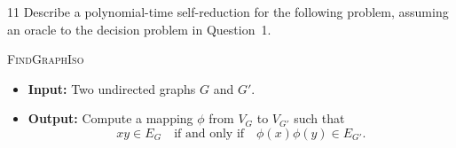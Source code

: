 \documentclass[12pt]{article}
\begin{document}
\begin{problem}{11}
    Describe a polynomial-time self-reduction for the following problem, assuming an oracle to the decision problem in Question~1.

    \begin{tcolorbox}
        \textsc{FindGraphIso}
        \begin{itemize}
            \item \textbf{Input:} Two undirected graphs $G$ and $G'$.
            \item \textbf{Output:} Compute a mapping $\phi$ from $V_G$ to $V_{G'}$ such that
            \[
            xy \in E_G
            \quad \text{if and only if} \quad
            \phi(x)\phi(y) \in E_{G'}.
            \]
        \end{itemize}
    \end{tcolorbox}
\end{problem}
\end{document}
